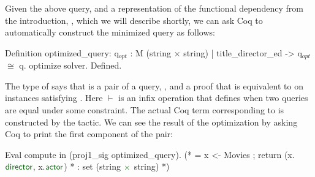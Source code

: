 \documentclass[preprint]{sigplanconf}
\begin{document}
Given the above query, and a representation of the functional dependency from the introduction, , which we will describe shortly, we can ask Coq to automatically construct the minimized query as follows:
\begin{coq}
Definition optimized_query:
{q$_{opt}$ : M (string $\times$ string) | title_director_ed -> q$_{opt}$ $\cong$ q}.
optimize solver.
Defined.
\end{coq}
The type of  says that  is a pair of a query, , and a proof that  is equivalent to  on instances satisfying .  Here $\vdash$ is an infix operation that defines when two queries are equal under some constraint.  The actual Coq term corresponding to  is constructed by the  tactic.  We can see the result of the optimization by asking Coq to print the first component of the pair:
\begin{coq}
Eval compute in (proj1_sig optimized_query).
(* = x <- Movies ; return (x.$\textcolor{dkgreen}{\textsf{director}}$, x.$\textcolor{dkgreen}{\textsf{actor}}$)
 *   : set (string $\textcolor{dkgreen}{\times}$ string)   *)
\end{coq}


 
\end{document}
